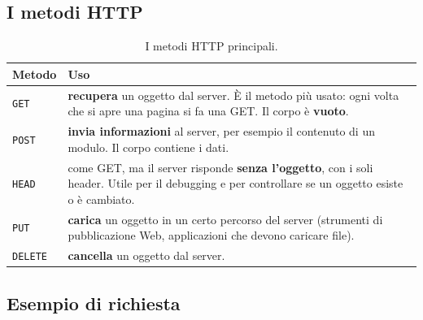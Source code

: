 
\subsection{I metodi HTTP}

\begin{table}[H]
\centering
\begin{tabular}{lp{12cm}}
\toprule
\textbf{Metodo} & \textbf{Uso} \\
\midrule
\texttt{GET} & \textbf{recupera} un oggetto dal server. È il metodo più usato: ogni volta che si apre una pagina si
fa una GET. Il corpo è \textbf{vuoto}. \\
\texttt{POST} & \textbf{invia informazioni} al server, per esempio il contenuto di un modulo. Il corpo contiene
i dati. \\
\texttt{HEAD} & come GET, ma il server risponde \textbf{senza l'oggetto}, con i soli header. Utile per il
debugging e per controllare se un oggetto esiste o è cambiato. \\
\texttt{PUT} & \textbf{carica} un oggetto in un certo percorso del server (strumenti di pubblicazione Web,
applicazioni che devono caricare file). \\
\texttt{DELETE} & \textbf{cancella} un oggetto dal server. \\
\bottomrule
\end{tabular}
\caption{I metodi HTTP principali.}
\end{table}


\subsection{Esempio di richiesta}


